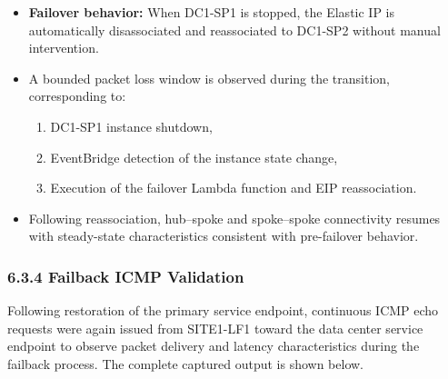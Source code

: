 \documentclass[11pt]{article}
\begin{document}
\begin{itemize}
  \item \textbf{Failover behavior:}
        When DC1-SP1 is stopped, the Elastic IP is automatically disassociated and
        reassociated to DC1-SP2 without manual intervention.
  \item A bounded packet loss window is observed during the transition, corresponding to:
        \begin{enumerate}
          \item DC1-SP1 instance shutdown,
          \item EventBridge detection of the instance state change,
          \item Execution of the failover Lambda function and EIP reassociation.
        \end{enumerate}
  \item Following reassociation, hub--spoke and spoke--spoke connectivity resumes with
        steady-state characteristics consistent with pre-failover behavior.
\end{itemize}

%
%
%
%
\subsubsection{6.3.4 Failback ICMP Validation}
\label{sec:failback-validation}

Following restoration of the primary service endpoint, continuous ICMP echo requests were again issued from SITE1-LF1 toward the data center service endpoint to observe packet delivery and latency characteristics during the failback process. The complete captured output is shown below.
\end{document}
